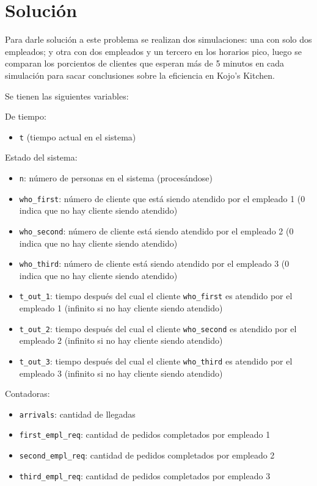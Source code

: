 \documentclass{article}
\begin{document}
    \section*{Solución}
        Para darle solución a este problema se realizan dos simulaciones: una con solo dos empleados; y otra con dos empleados y un tercero
        en los horarios pico, luego se comparan los porcientos de clientes que esperan más de 5 minutos en cada simulación para sacar
        conclusiones sobre la eficiencia en Kojo's Kitchen.

        Se tienen las siguientes variables:

        De tiempo:

        \begin{itemize}[label=\textbullet]
            \item \texttt{t} (tiempo actual en el sistema)
        \end{itemize}

        Estado del sistema:

        \begin{itemize}[label=\textbullet]
            \item \texttt{n}: número de personas en el sistema (procesándose)
            \item \texttt{who\_first}: número de cliente que está siendo atendido por el empleado 1 (0 indica que no hay cliente siendo atendido)
            \item \texttt{who\_second}: número de cliente está siendo atendido por el empleado 2 (0 indica que no hay cliente siendo atendido)
            \item \texttt{who\_third}: número de cliente está siendo atendido por el empleado 3 (0 indica que no hay cliente siendo atendido)
            \item \texttt{t\_out\_1}: tiempo después del cual el cliente \texttt{who\_first} es atendido por el empleado 1 (infinito si no hay cliente siendo atendido)
            \item \texttt{t\_out\_2}: tiempo después del cual el cliente \texttt{who\_second} es atendido por el empleado 2 (infinito si no hay cliente siendo atendido)
            \item \texttt{t\_out\_3}: tiempo después del cual el cliente \texttt{who\_third} es atendido por el empleado 3 (infinito si no hay cliente siendo atendido)
        \end{itemize}

        Contadoras:

        \begin{itemize}[label=\textbullet]
            \item \texttt{arrivals}: cantidad de llegadas
            \item \texttt{first\_empl\_req}: cantidad de pedidos completados por empleado 1
            \item \texttt{second\_empl\_req}: cantidad de pedidos completados por empleado 2
            \item \texttt{third\_empl\_req}: cantidad de pedidos completados por empleado 3
        \end{itemize}
\end{document}
